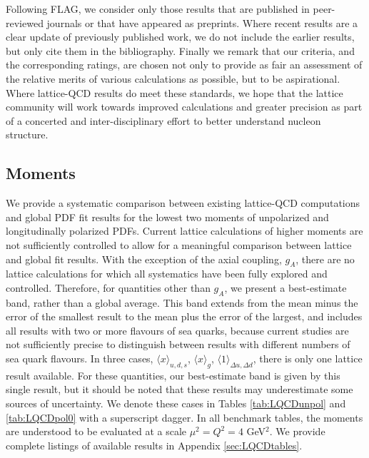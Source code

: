 %
%
Following FLAG, we consider only those results that
are published in peer-reviewed journals or that have appeared as preprints. 
%
Where recent results are a clear update of previously published work, we do 
not include the earlier results, but only cite them in the bibliography. 
%
Finally we remark that our criteria, and the corresponding ratings, are chosen 
not only to provide as fair an assessment of the relative merits of various 
calculations as possible, but to be aspirational. 
%
Where lattice-QCD results do meet these standards, we hope that the lattice 
community will work towards improved calculations and greater precision as 
part of a concerted and inter-disciplinary effort to better understand
nucleon structure.




\subsection{Moments}

We provide a systematic comparison between existing lattice-QCD computations
and global PDF fit results for the lowest two moments of unpolarized
and longitudinally polarized PDFs. 
%
Current lattice calculations of higher moments are not sufficiently controlled 
to allow for a meaningful comparison between lattice and global fit results.
%
With the exception of the axial coupling, $g_A$, there are no lattice calculations
for which all systematics have been fully explored and controlled. Therefore, 
for quantities other than $g_A$, we present a best-estimate band, rather than a global average. This band extends from the mean minus the error of the
smallest result to the mean plus the error of the largest, and includes all results
with two or more flavours of sea quarks, because current studies are not sufficiently
precise to distinguish between results with different numbers of sea quark flavours.
In three cases, $\langle x \rangle_{u,d,s}$, $\langle x \rangle_g$, $\langle 1 \rangle_{\Delta u,\Delta d}$, there is only one
lattice result available. For these quantities, our best-estimate band is given by this single result, but 
it should be noted that these results may underestimate some sources of uncertainty. We denote
these cases in Tables \ref{tab:LQCDunpol} and \ref{tab:LQCDpol0} with a superscript dagger.
In all benchmark tables, the moments are understood to be evaluated at a scale $\mu^2 = Q^2=4$ GeV$^2$. 
%
We provide complete listings of available results in Appendix \ref{sec:LQCDtables}.



